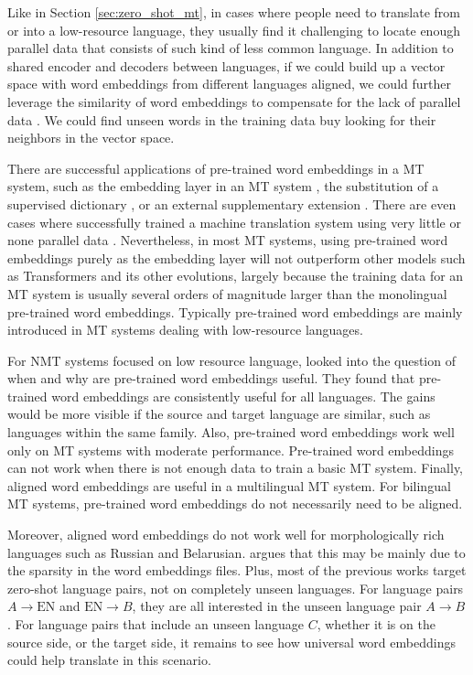 \documentclass[thesis,fonts=libertine]{cluu}
\begin{document}
Like in Section \ref{sec:zero_shot_mt}, in cases where people need to translate from or into a low-resource language, they usually find it challenging to locate enough parallel data that consists of such kind of less common language. In addition to shared encoder and decoders between languages, if we could build up a vector space with word embeddings from different languages aligned, we could further leverage the similarity of word embeddings to compensate for the lack of parallel data \parencite{zou-etal-2013-bilingual}. We could find unseen words in the training data buy looking for their neighbors in the vector space.

There are successful applications of pre-trained word embeddings in a MT system, such as the embedding layer in an MT system \parencite{neishi-etal-2017-bag, Artetxe:2017aa}, the substitution of a supervised dictionary \parencite{Conneau:2017aa}, or an external supplementary extension \cite{inproceedings}. There are even cases where successfully trained a machine translation system using very little or none parallel data \parencite{Conneau:2017aa}. Nevertheless, in most MT systems, using pre-trained word embeddings purely as the embedding layer will not outperform other models such as Transformers \parencite{Vaswani:2017aa} and its other evolutions, largely because the training data for an MT system is usually several orders of magnitude larger than the monolingual pre-trained word embeddings. Typically pre-trained word embeddings are mainly introduced in MT systems dealing with low-resource languages.

For NMT systems focused on low resource language, \cite{Qi:2018aa} looked into the question of when and why are pre-trained word embeddings useful. They found that pre-trained word embeddings are consistently useful for all languages. The gains would be more visible if the source and target language are similar, such as languages within the same family. Also, pre-trained word embeddings work well only on MT systems with moderate performance. Pre-trained word embeddings can not work when there is not enough data to train a basic MT system. Finally, aligned word embeddings are useful in a multilingual MT system. For bilingual MT systems, pre-trained word embeddings do not necessarily need to be aligned.

Moreover, aligned word embeddings do not work well for morphologically rich languages such as Russian and Belarusian. \cite{Qi:2018aa} argues that this may be mainly due to the sparsity in the word embeddings files. Plus, most of the previous works target zero-shot language pairs, not on completely unseen languages. For language pairs $A \rightarrow \text{EN}$ and $\text{EN} \rightarrow B$, they are all interested in the unseen language pair $A \rightarrow B$. For language pairs that include an unseen language $C$, whether it is on the source side, or the target side, it remains to see how universal word embeddings could help translate in this scenario.
\end{document}
